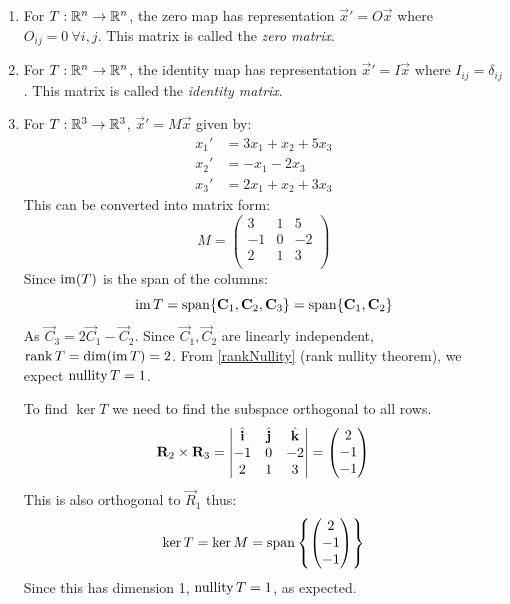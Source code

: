 \documentclass[../main.tex]{subfiles}
\begin{document}
\begin{example}
  \begin{enumerate}
    \item For $T: \mathbb{R}^{n} \to \mathbb{R}^{n}$, the zero map has representation $\vec{x}' = O\vec{x}$ where $O_{ij} = 0\ \forall i, j$.
      This matrix is called the \textit{zero matrix}.
    \item For $T: \mathbb{R}^{n} \to \mathbb{R}^{n}$, the identity map has representation $\vec{x}' = I\vec{x}$ where $I_{i j} = \delta_{i j}$.
      This matrix is called the \textit{identity matrix}.
    \item For $T: \mathbb{R}^3 \to \mathbb{R}^3$, $\vec{x}' = M \vec{x}$ given by:
      \begin{align*}
        x_1' &= 3x_1 + x_2 + 5x_3 \\
        x_2' &= -x_1 - 2x_3 \\
        x_3' &= 2x_1 + x_2 + 3x_3
      \end{align*}
      This can be converted into matrix form:
      \[
        M = \begin{pmatrix}
        3 & 1 & 5 \\
        -1 & 0 & -2 \\
        2 & 1 & 3 \\
        \end{pmatrix}
      \]
      Since $\operatorname{im}(T)$ is the span of the columns:
      \[
        \operatorname{im} T = \operatorname{span}\{\mathbf{\bm{C}}_1, \mathbf{\bm{C}}_2, \mathbf{\bm{C}}_3\} = \operatorname{span}\{\mathbf{\bm{C}}_1, \mathbf{\bm{C}}_2\}
      \]
      As $\vec{C}_3 = 2\vec{C}_1 - \vec{C}_2$.
      Since $\vec{C}_1, \vec{C}_2$ are linearly independent, $\operatorname{rank} T = \dim(\operatorname{im} T) = 2$.
      From \cref{rankNullity} (rank nullity theorem), we expect $\operatorname{nullity} T = 1$.

      To find $\ker T$ we need to find the subspace orthogonal to all rows.
      \[
        \mathbf{\bm{R}}_2 \times \mathbf{\bm{R}}_3 = \begin{vmatrix}
        \hat{\mathbf{\bm{i}}} & \hat{\mathbf{\bm{j}}} & \hat{\mathbf{\bm{k}}} \\
        -1 & 0 & -2 \\
        2 & 1 & 3 \\
        \end{vmatrix} =
        \begin{pmatrix}
        2 \\
        -1 \\
        -1 \\
        \end{pmatrix}
      \]
      This is also orthogonal to $\vec{R}_1$ thus:
      \[
        \ker T = \ker M = \operatorname{span}\left\{
        \begin{pmatrix}
        2 \\
        -1 \\
        -1 \\
        \end{pmatrix}\right\}
      \]
      Since this has dimension 1, $\operatorname{nullity} T = 1$, as expected.
  \end{enumerate}
\end{example}
\end{document}

